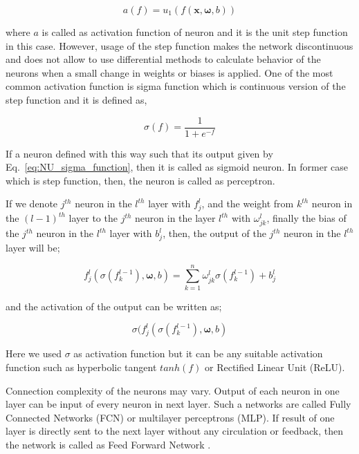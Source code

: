 \documentclass[a4paper,times,12pt]{article}
\begin{document}
\begin{equation}
\label{eq:NU_step_function}
a(f) = u_1(f(\boldsymbol{x}, \boldsymbol{\omega}, b))
\end{equation}

where $a$ is called as activation function of neuron and it is the unit step function in this case. However, usage of the step function makes the network discontinuous and does not allow to use differential methods to calculate behavior of the neurons when a small change in weights or biases is applied. One of the most common activation function is sigma function which is continuous version of the step function and it is defined as,

\begin{equation}
\label{eq:NU_sigma_function}
\sigma(f) = \frac{1}{1 + e^{-f}}
\end{equation}

If a neuron defined with this way such that its output given by Eq.~\ref{eq:NU_sigma_function}, then it is called as sigmoid neuron. In former case which is step function, then, the neuron is called as perceptron. 

If we denote $j^{th}$ neuron in the $l^{th}$ layer with $f_j^l$, and the weight from $k^{th}$ neuron in the $(l-1)^{th}$ layer to the $j^{th}$ neuron in the layer $l^{th}$ with $\omega_{jk}^l$, finally the bias of the $j^{th}$ neuron in the $l^{th}$ layer with ${b_j^l}$, then, the output of the $j^{th}$ neuron in the $l^{th}$ layer will be;

\begin{equation}
\label{eq:NU_neuron_connection}
f_j^{l}(\sigma(f_k^{l-1}), \boldsymbol{\omega}, b) = \sum\limits_{k=1}^{n} \omega_{jk}^{l}\sigma(f_k^{l-1}) + b_j^l
\end{equation}

\noindent and the activation of the output can be written as;

\begin{equation}
\sigma(f_j^{l}(\sigma(f_k^{l-1}), \boldsymbol{\omega}, b)
\end{equation}


\noindent Here we used $\sigma$ as activation function but it can be any suitable activation function such as hyperbolic tangent $tanh(f)$ or Rectified Linear Unit (ReLU).

Connection complexity of the neurons may vary. Output of each neuron in one layer can be input of every neuron in next layer. Such a networks are called Fully Connected Networks (FCN) or multilayer perceptrons (MLP)\cite{nielsen2015neural}. If result of one layer is directly sent to the next layer without any circulation or feedback, then the network is called as Feed Forward Network \cite{nielsen2015neural}.
\end{document}
